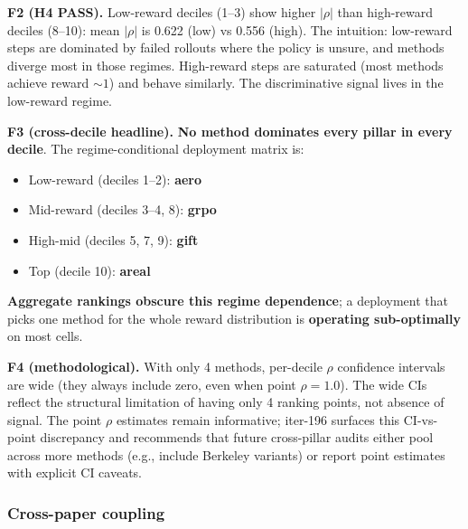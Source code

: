 \textbf{F2 (H4 PASS).}
Low-reward deciles (1--3) show higher $|\rho|$ than high-reward deciles
(8--10): mean $|\rho|$ is 0.622 (low) vs 0.556 (high). The intuition:
low-reward steps are dominated by failed rollouts where the policy is
unsure, and methods diverge most in those regimes. High-reward steps
are saturated (most methods achieve reward $\sim 1$) and behave
similarly. The discriminative signal lives in the low-reward regime.

\textbf{F3 (cross-decile headline).}
\textbf{No method dominates every pillar in every decile}. The
regime-conditional deployment matrix is:
\begin{itemize}
\item Low-reward (deciles 1--2): \textbf{aero}
\item Mid-reward (deciles 3--4, 8): \textbf{grpo}
\item High-mid (deciles 5, 7, 9): \textbf{gift}
\item Top (decile 10): \textbf{areal}
\end{itemize}
\textbf{Aggregate rankings obscure this regime dependence}; a deployment
that picks one method for the whole reward distribution is
\textbf{operating sub-optimally} on most cells.

\textbf{F4 (methodological).}
With only 4 methods, per-decile $\rho$ confidence intervals are wide
(they always include zero, even when point $\rho = 1.0$). The wide CIs
reflect the structural limitation of having only 4 ranking points, not
absence of signal. The point $\rho$ estimates remain informative; iter-196
surfaces this CI-vs-point discrepancy and recommends that future
cross-pillar audits either pool across more methods (e.g., include
Berkeley variants) or report point estimates with explicit CI caveats.

\subsubsection{Cross-paper coupling}\label{sec:synth-d21-coupling}


